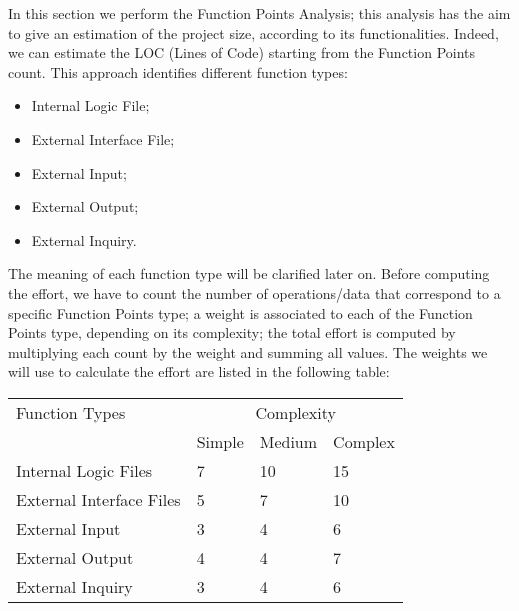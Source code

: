 In this section we perform the Function Points Analysis; this analysis has the aim to give an estimation of the project size, according to its functionalities. Indeed, we can estimate the LOC (Lines of Code) starting from the Function Points count.
This approach identifies different function types:
\begin{itemize}
    \item Internal Logic File;
    \item External Interface File;
    \item External Input;
    \item External Output;
    \item External Inquiry.
\end{itemize}
The meaning of each function type will be clarified later on.
\newline
Before computing the effort, we have to count the number of operations/data that correspond to a specific Function Points type; a weight is associated to each of the Function Points type, depending on its complexity; the total effort is computed by multiplying each count by the weight and summing all values.
\newpage
The weights we will use to calculate the effort are listed in the following table:
\begin{table}[H]
    \centering
    \begin{tabular}{|l|l|l|l|}
        \hline
        Function Types & \multicolumn{3}{c|}{ Complexity } \\ \cline{2-4} 
    
        & Simple & Medium & Complex \\ \cline{1-3} 
        \hline
        Internal Logic Files & 7 & 10 &  15\\
        \hline
        External Interface Files & 5 & 7 & 10 \\
        \hline
        External Input & 3 & 4 & 6 \\
        \hline
        External Output & 4 & 4 & 7 \\
        \hline
        External Inquiry & 3 & 4 & 6 \\
        \hline
    \end{tabular}
\end{table}



